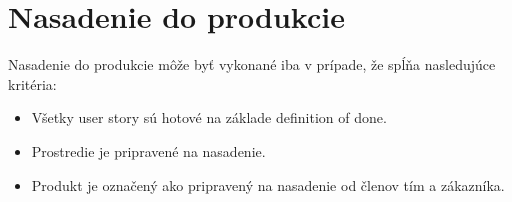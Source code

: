 \documentclass{article}
\begin{document}
    \section*{Nasadenie do produkcie}

    \textnormal{Nasadenie do produkcie môže byť vykonané iba v prípade, že spĺňa nasledujúce kritéria:}

    \begin{itemize}
        \item Všetky user story sú hotové na základe definition of done.
        \item Prostredie je pripravené na nasadenie.
        \item Produkt je označený ako pripravený na nasadenie od členov tím a zákazníka.
    \end{itemize}
\end{document}
